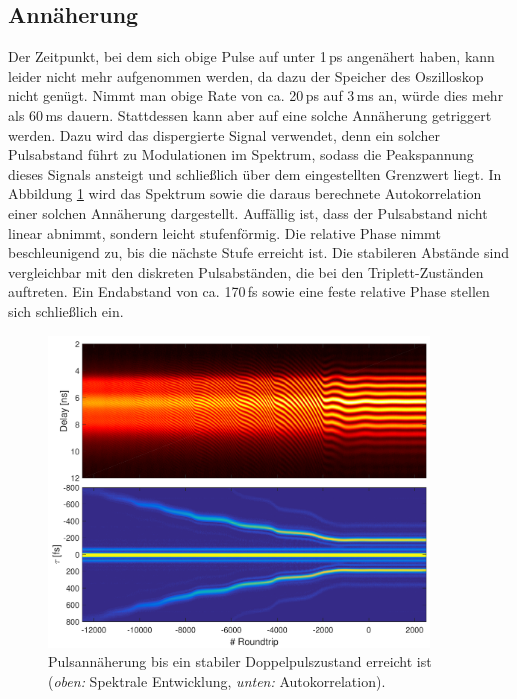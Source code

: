 \documentclass[bachelor,       %
               twoside,        %
               BCOR10mm,       %
               liststotoc,nomtotoc,bibtotoc, %
               english,ngerman, %
               final,          %
               ]{GAUBM}
\begin{document}
\clearpage
\subsection{Annäherung}
Der Zeitpunkt, bei dem sich obige Pulse auf unter 1\,ps angenähert haben, kann leider nicht mehr aufgenommen werden, da dazu der Speicher des Oszilloskop nicht genügt.
Nimmt man obige Rate von ca. 20\,ps auf 3\,ms an, würde dies mehr als 60\,ms dauern.
Stattdessen kann aber auf eine solche Annäherung getriggert werden.
Dazu wird das dispergierte Signal verwendet, denn ein solcher Pulsabstand führt zu Modulationen im Spektrum, sodass die Peakspannung dieses Signals ansteigt und schließlich über dem eingestellten Grenzwert liegt.
In Abbildung \ref{fig:StartAnnaeherung} wird das Spektrum sowie die daraus berechnete Autokorrelation einer solchen Annäherung dargestellt.
Auffällig ist, dass der Pulsabstand nicht linear abnimmt, sondern leicht stufenförmig.
Die relative Phase nimmt beschleunigend zu, bis die nächste Stufe erreicht ist.
Die stabileren Abstände sind vergleichbar mit den diskreten Pulsabständen, die bei den Triplett-Zuständen auftreten.
Ein Endabstand von ca. 170\,fs sowie eine feste relative Phase stellen sich schließlich ein.
\begin{figure}[!htb]
	\centering
	\includegraphics[width=0.9\textwidth]{figures/4ms_25GSA_400m_MLstart_Doppelpulse2_Annaeherung_280500}
	\caption{Pulsannäherung bis ein stabiler Doppelpulszustand erreicht ist\\
	(\textit{oben:} Spektrale Entwicklung, \textit{unten:} Autokorrelation).}
	\label{fig:StartAnnaeherung}
\end{figure}
\end{document}
